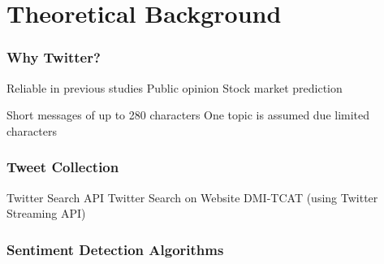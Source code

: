 
\section{Theoretical Background}

\begin{frame}
    \frametitle{Why Twitter?}

    \begin{outline}
        \1 Reliable in previous studies \citep{Barbosa2010}
            \2 Public opinion \citep{Oconnor2010a,Patodkar2016a}
            \2 Stock market prediction \citep{Bollen2011a,Mittal2012a,Nguyen2015a,Pagolu2016a,Zhang2011a}

        \1 Short messages of up to 280 characters \citep{Rosen2017}
        \1 One topic is assumed due limited characters \citep{Pagolu2016a,Patodkar2016a}
    \end{outline}
\end{frame}
  

\begin{frame}
    \frametitle{Tweet Collection}

    \begin{outline}
        \1 Twitter Search API
        \1 Twitter Search on Website
        \1 DMI-TCAT (using Twitter Streaming API)
    \end{outline}
\end{frame}

\begin{frame}
    \frametitle{Sentiment Detection Algorithms}

    \begin{outline}
        \1 \tb{}
        \1 \nb{}
        \1 \me{}
        \1 \svm{}
    \end{outline}
\end{frame}

